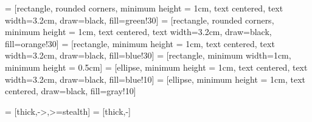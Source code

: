 %
%
%


 =  [rectangle, rounded corners, minimum height = 1cm, text centered, text width=3.2cm, draw=black, fill=green!30]
 =  [rectangle, rounded corners, minimum height = 1cm, text centered, text width=3.2cm, draw=black, fill=orange!30]
 =  [rectangle, minimum height = 1cm, text centered, text width=3.2cm, draw=black, fill=blue!30]
 =  [rectangle,  minimum width=1cm, minimum height = 0.5cm]
 =  [ellipse, minimum height = 1cm, text centered, text width=3.2cm, draw=black, fill=blue!10]
 =  [ellipse, minimum height = 1cm, text centered, draw=black, fill=gray!10]

 = [thick,->,>=stealth]
 = [thick,-]









